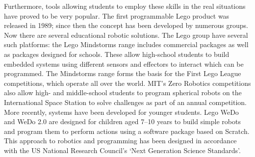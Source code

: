     Furthermore, tools allowing students to employ these skills in the real situations have proved to be very popular. The first programmable Lego product was released in 1989; since then the concept has been developed by numerous groups. Now there are several educational robotic solutions. The Lego group have several such platforms: the Lego Mindstorms range includes commercial packages as well as packages designed for schools. These allow high-school students to build embedded systems using different sensors and effectors to interact which can be programmed. The Mindstorms range forms the basis for the First Lego League competitions, which operate all over the world. MIT's Zero Robotics competitions also allow high- and middle-school students to program spherical robots on the International Space Station to solve challenges as part of an annual competition.\cite{zerorobotics}\\
    More recently, systems have been developed for younger students. Lego WeDo and WeDo 2.0 are designed for children aged 7--10 years to build simple robots and program them to perform actions using a software package based on Scratch.\cite{wedo2} This approach to robotics and programming has been designed in accordance with the US National Research Council's `Next Generation Science Standards'.

